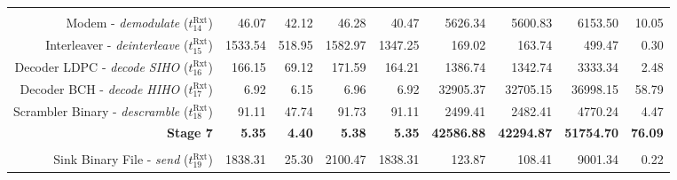\begin{table}[htp]
{{\begin{tabular}{r | r r r r  | r r r | r}
                                                                              &                  &                   &                   &                                         &                   &                   &                   &                \\
                            Modem -   \emph{demodulate} ($t^\text{Rxt}_{14}$) &           46.07  &            42.12  &            46.28  &                                  40.47  &          5626.34  &          5600.83  &          6153.50  &         10.05  \\
                      Interleaver - \emph{deinterleave} ($t^\text{Rxt}_{15}$) &         1533.54  &           518.95  &          1582.97  &                                1347.25  &           169.02  &           163.74  &           499.47  &          0.30  \\
                     Decoder LDPC -  \emph{decode SIHO} ($t^\text{Rxt}_{16}$) &          166.15  &            69.12  &           171.59  &                                 164.21  &          1386.74  &          1342.74  &          3333.34  &          2.48  \\
                      Decoder BCH -  \emph{decode HIHO} ($t^\text{Rxt}_{17}$) &            6.92  &             6.15  &             6.96  &                                   6.92  &         32905.37  &         32705.15  &         36998.15  &         58.79  \\
                 Scrambler Binary -   \emph{descramble} ($t^\text{Rxt}_{18}$) &           91.11  &            47.74  &            91.73  &                                  91.11  &          2499.41  &          2482.41  &          4770.24  &          4.47  \\ \hline
                 \textbf{Stage 7}                                             &    \textbf{5.35} &     \textbf{4.40} &     \textbf{5.38} &                           \textbf{5.35} & \textbf{42586.88} & \textbf{42294.87} & \textbf{51754.70} & \textbf{76.09} \\ %
                                                                              &                  &                   &                   &                                         &                   &                   &                   &                \\
                 Sink Binary File -         \emph{send} ($t^\text{Rxt}_{19}$) &         1838.31  &            25.30  &          2100.47  &                                1838.31  &           123.87  &           108.41  &          9001.34  &          0.22  \\ \hline

\end{tabular}}}
\end{table}
